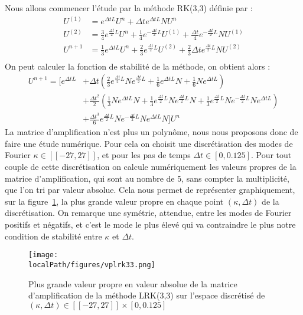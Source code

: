 Nous allons commencer l'étude par la méthode RK(3,3) définie par :
$$
  \begin{aligned}
    U^{(1)} &= e^{\Delta tL}U^n + \Delta te^{\Delta tL}NU^n \\
    U^{(2)} &= \frac{3}{4}e^{\frac{\Delta t}{2}L}U^n + \frac{1}{4}e^{-\frac{\Delta t}{2}L}U^{(1)} + \frac{\Delta t}{4}e^{-\frac{\Delta t}{2}L}NU^{(1)} \\
    U^{n+1} &= \frac{1}{3}e^{\Delta tL}U^n + \frac{2}{3}e^{\frac{\Delta t}{2}L}U^{(2)} + \frac{2}{3}\Delta te^{\frac{\Delta t}{2}L}NU^{(2)} \\
  \end{aligned}
$$
On peut calculer la fonction de stabilité de la méthode, on obtient alors :
$$
  \begin{aligned}
    U^{n+1} = \Big[ e^{\Delta tL} &+ \Delta t\left(\frac{2}{3}e^{\frac{\Delta t}{2}L}Ne^{\frac{\Delta t}{2}L}+\frac{1}{6}e^{\Delta tL}N + \frac{1}{6}Ne^{\Delta tL}\right) \\
    & + \frac{\Delta t^2}{2}\left(\frac{1}{3}Ne^{\Delta tL}N + \frac{1}{3}e^{\frac{\Delta t}{2}L}Ne^{\frac{\Delta t}{2}L}N + \frac{1}{3} e^{\frac{\Delta t}{2}L}Ne^{-\frac{\Delta t}{2}L}Ne^{\Delta tL} \right) \\
    & + \frac{\Delta t^3}{6}e^{\frac{\Delta t}{2}L}Ne^{-\frac{\Delta t}{2}L}Ne^{\Delta tL}N \Big]U^n
  \end{aligned}
$$
La matrice d'amplification n'est plus un polynôme, nous nous proposons donc de faire une étude numérique. Pour cela on choisit une discrétisation des modes de Fourier $\kappa\in[\![-27,27]\!]$, et pour les pas de temps $\Delta t\in[0,0.125]$. Pour tout couple de cette discrétisation on calcule numériquement les valeurs propres de la matrice d'amplification, qui sont au nombre de 5, sans compter la multiplicité, que l'on tri par valeur absolue. Cela nous permet de représenter graphiquement, sur la figure~\ref{fig:3:vplrk33}, la plus grande valeur propre en chaque point $(\kappa,\Delta t)$ de la discrétisation. On remarque une symétrie, attendue, entre les modes de Fourier positifs et négatifs, et c'est le mode le plus élevé qui va contraindre le plus notre condition de stabilité entre $\kappa$ et $\Delta t$.
\begin{figure}[h]
  \centering
  \texttt{[image: \\localPath/figures/vplrk33.png]}
  \caption{Plus grande valeur propre en valeur absolue de la matrice d'amplification de la méthode LRK(3,3) sur l'espace discrétisé de $(\kappa,\Delta t)\in[\![-27,27]\!]\times[0,0.125]$}
  \label{fig:3:vplrk33}
\end{figure}
